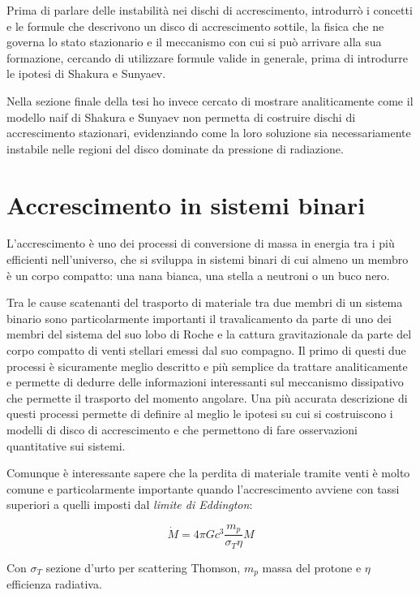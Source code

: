 \documentclass[a4paperbi]{article}
\begin{document}
	Prima di parlare delle instabilità nei dischi di accrescimento, introdurrò i concetti e le formule che descrivono un disco di accrescimento sottile, la fisica che ne governa lo stato stazionario e il meccanismo con cui si può arrivare alla sua formazione, cercando di utilizzare formule valide in generale, prima di introdurre le ipotesi di Shakura e Sunyaev.
	
	Nella sezione finale della tesi ho invece cercato di mostrare analiticamente come il modello naif di Shakura e Sunyaev
non permetta di costruire dischi di accrescimento stazionari, evidenziando come la loro soluzione sia necessariamente instabile nelle regioni del disco dominate da pressione di radiazione.
	
\newpage
\section{Accrescimento in sistemi binari}
	L'accrescimento è uno dei processi di conversione di massa in energia tra i più efficienti nell'universo, che si sviluppa in sistemi binari di cui almeno un membro è un corpo compatto: una nana bianca, una stella a neutroni o un buco nero.

	Tra le cause scatenanti del trasporto di materiale tra due membri di un sistema binario sono particolarmente importanti il travalicamento da parte di uno dei membri del sistema del suo lobo di Roche e la cattura gravitazionale da parte del corpo compatto di venti stellari emessi dal suo compagno. Il primo di questi due processi è sicuramente meglio descritto e più semplice da trattare analiticamente e permette di dedurre delle informazioni interessanti sul meccanismo dissipativo che permette il trasporto del momento angolare. Una più accurata descrizione di questi processi permette di definire al meglio le ipotesi su cui si costruiscono i modelli di disco di accrescimento e che permettono di fare osservazioni quantitative sui sistemi.
	
	Comunque è interessante sapere che la perdita di materiale tramite venti è molto comune e particolarmente importante quando l'accrescimento avviene con tassi superiori a quelli imposti dal \textit{limite di Eddington}:
	
	\begin{equation}
		\dot{M}=4\pi Gc^3\frac{m_p}{\sigma_T \eta}M
	\end{equation}
	
	Con $\sigma_T$ sezione d'urto per scattering Thomson, $m_p$ massa del protone e $\eta$ efficienza radiativa. 
\end{document}
